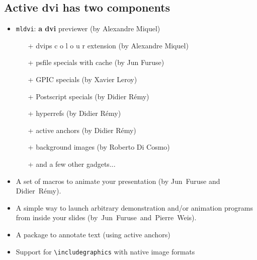 \documentclass[12pt]{article}
\begin{document}
\newpage


\subsection* {Active dvi has two components}

\begin{itemize}
\item {\tt mldvi}: {\bf a dvi} previewer (by Alexandre Miquel)
\begin {itemize}
\item[+] dvips
  \textcolor{c1}{c}%
  \textcolor{c2}{o}%
  \textcolor{c3}{l}%
  \textcolor{c4}{o}%
  \textcolor{c5}{u}%
  \textcolor{c6}{r}
  extension (by Alexandre Miquel)
\item[+] psfile specials with cache (by Jun Furuse)
\item[+] GPIC specials (by Xavier Leroy)
\item[+] Postscript specials (by Didier R{\'{e}}my)
\item[+] hyperrefs (by Didier R{\'{e}}my)
\item[+] active anchors (by Didier R{\'{e}}my)
\item[+] background images (by Roberto Di Cosmo)
\item[+] and a few other gadgets...
\end {itemize}
\end{itemize}

\begin{itemize}
\item 
A set of macros to animate your presentation 
(by Jun~Furuse and Didier~R{\'{e}}my).
 
\item 
A simple way to launch arbitrary demonstration and/or animation
programs from inside your slides
\hbox {(by Jun Furuse and Pierre Weis)}.

\item 
A package to annotate text (using active anchors)

\item
Support for \verb+\includegraphics+ with native image formats

\end{itemize}

\newpage

\def \flash #1{\let \do\leflash \do #1\relax}
\def \leflash #1{\ifx #1\relax \def \do{}\else \def \do {#1\adviwait[0.05]\leflash}\fi \do}

\def\goon{\hbox{{\Large $\Rightarrow$}~Type~space~to~go~on}}
\end{document}
